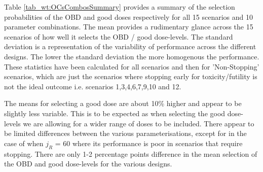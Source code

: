 Table \ref{tab_wt:OCsCombosSummary} provides a summary of the selection probabilities of the OBD and good doses respectively for all 15 scenarios and 10 parameter combinations. The mean provides a rudimentary glance across the 15 scenarios of how well it selects the OBD / good dose-levels. The standard deviation is a representation of the variability of performance across the different designs. The lower the standard deviation the more homogenous the performance. These statistics have been calculated for all scenarios and then for 'Non-Stopping' scenarios, which are just the scenarios where stopping early for toxicity/futility is not the ideal outcome i.e. scenarios 1,3,4,6,7,9,10 and 12. 

The means for selecting a good dose are about 10\% higher and appear to be slightly less variable. This is to be expected as when selecting the good dose-levels we are allowing for a wider range of doses to be included. There appear to be limited differences between the various parameterisations, except for in the case of when $j_R$ = 60 where its performance is poor in scenarios that require stopping. There are only 1-2 percentage points difference in the mean selection of the OBD and good dose-levels for the various designs. 


